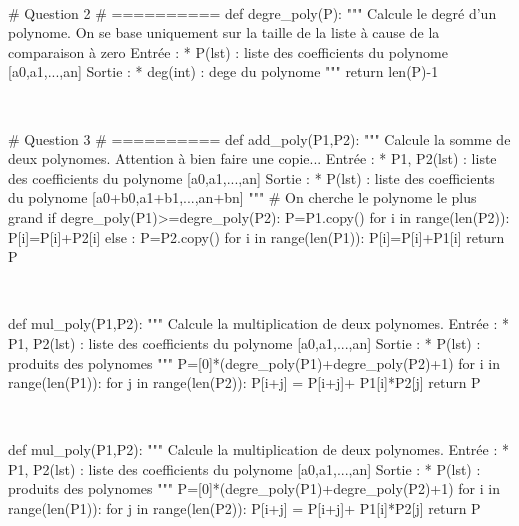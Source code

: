 \documentclass[10pt,fleqn]{article} %
\begin{document}
\begin{corrige}
$\quad$
\begin{python}
# Question 2
# ==========
def degre_poly(P):
    """
    Calcule le degré d'un polynome.
    On se base uniquement sur la taille de la liste 
    à cause de la comparaison à zero
    Entrée : 
     * P(lst) : liste des coefficients du polynome 
       [a0,a1,...,an]
    Sortie : 
     * deg(int) : dege du polynome
    """
    return len(P)-1
\end{python}
\end{corrige}

\begin{corrige}
$\quad$
\begin{python}
# Question 3
# ==========
def add_poly(P1,P2):
    """
    Calcule la somme de deux polynomes.
    Attention à bien faire une copie...
    Entrée : 
     * P1, P2(lst) : liste des coefficients du 
        polynome [a0,a1,...,an]
    Sortie : 
     * P(lst) : liste des coefficients du 
        polynome [a0+b0,a1+b1,...,an+bn]
    """
    # On cherche le polynome le plus grand
    if degre_poly(P1)>=degre_poly(P2):
        P=P1.copy()
        for i in range(len(P2)):
            P[i]=P[i]+P2[i]
    else :
        P=P2.copy()
        for i in range(len(P1)):
            P[i]=P[i]+P1[i]
    return P
\end{python}
\end{corrige}

\begin{corrige}
$\quad$
\begin{python}
def mul_poly(P1,P2):
    """
    Calcule la multiplication de deux polynomes.
    Entrée : 
     * P1, P2(lst) : liste des coefficients du 
       polynome [a0,a1,...,an]
    Sortie : 
     * P(lst) : produits des polynomes
    """
    P=[0]*(degre_poly(P1)+degre_poly(P2)+1)
    for i in range(len(P1)):
        for j in range(len(P2)):
           P[i+j] = P[i+j]+ P1[i]*P2[j]
    return P
\end{python}
\end{corrige}

\begin{corrige}
$\quad$
\begin{python}
def mul_poly(P1,P2):
    """
    Calcule la multiplication de deux polynomes.
    Entrée : 
     * P1, P2(lst) : liste des coefficients du 
        polynome [a0,a1,...,an]
    Sortie : 
     * P(lst) : produits des polynomes
    """
    P=[0]*(degre_poly(P1)+degre_poly(P2)+1)
    for i in range(len(P1)):
        for j in range(len(P2)):
           P[i+j] = P[i+j]+ P1[i]*P2[j]
    return P
\end{python}
\end{corrige}
\end{document}
